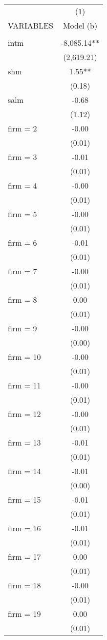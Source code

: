 \begin{tabular}{lc} \hline
 & (1) \\
VARIABLES & Model (b) \\ \hline
 &  \\
intm & -8,085.14** \\
 & (2,619.21) \\
shm & 1.55** \\
 & (0.18) \\
salm & -0.68 \\
 & (1.12) \\
firm = 2 & -0.00 \\
 & (0.01) \\
firm = 3 & -0.01 \\
 & (0.01) \\
firm = 4 & -0.00 \\
 & (0.01) \\
firm = 5 & -0.00 \\
 & (0.01) \\
firm = 6 & -0.01 \\
 & (0.01) \\
firm = 7 & -0.00 \\
 & (0.01) \\
firm = 8 & 0.00 \\
 & (0.01) \\
firm = 9 & -0.00 \\
 & (0.00) \\
firm = 10 & -0.00 \\
 & (0.01) \\
firm = 11 & -0.00 \\
 & (0.01) \\
firm = 12 & -0.00 \\
 & (0.01) \\
firm = 13 & -0.01 \\
 & (0.01) \\
firm = 14 & -0.01 \\
 & (0.00) \\
firm = 15 & -0.01 \\
 & (0.01) \\
firm = 16 & -0.01 \\
 & (0.01) \\
firm = 17 & 0.00 \\
 & (0.01) \\
firm = 18 & -0.00 \\
 & (0.01) \\
firm = 19 & 0.00 \\
 & (0.01) \\

\end{tabular}
